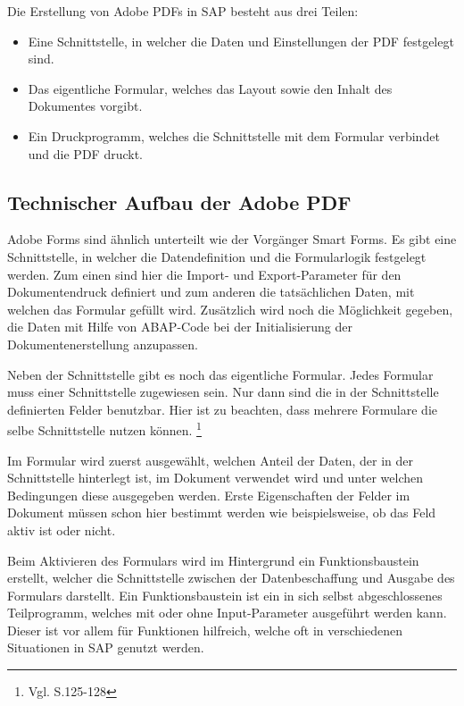    

Die Erstellung von Adobe PDFs in SAP besteht aus drei Teilen:

\begin{itemize}
	\item Eine Schnittstelle, in welcher die Daten und Einstellungen der PDF festgelegt sind.
	\item Das eigentliche Formular, welches das Layout sowie den Inhalt des Dokumentes vorgibt.
	\item Ein Druckprogramm, welches die Schnittstelle mit dem Formular verbindet und die PDF druckt.
\end{itemize}

\subsection{Technischer Aufbau der Adobe \ac{PDF}}

Adobe Forms sind ähnlich unterteilt wie der Vorgänger Smart Forms. Es gibt eine Schnittstelle, in welcher die Datendefinition und die Formularlogik festgelegt werden. Zum einen sind hier die Import- und Export-Parameter für den Dokumentendruck definiert und zum anderen die tatsächlichen Daten, mit welchen das Formular gefüllt wird. Zusätzlich wird noch die Möglichkeit gegeben, die Daten mit Hilfe von \ac{ABAP}-Code bei der Initialisierung der Dokumentenerstellung anzupassen.

Neben der Schnittstelle gibt es noch das eigentliche Formular. Jedes Formular muss einer Schnittstelle zugewiesen sein. Nur dann sind die in der Schnittstelle definierten Felder benutzbar. Hier ist zu beachten, dass mehrere Formulare die selbe Schnittstelle nutzen können. \footnote{Vgl. \cite{Hauser.2015} S.125-128} 

Im Formular wird zuerst ausgewählt, welchen Anteil der Daten, der in der Schnittstelle hinterlegt ist, im Dokument verwendet wird und unter welchen Bedingungen diese ausgegeben werden. Erste Eigenschaften der Felder im Dokument müssen schon hier bestimmt werden wie beispielsweise, ob das Feld aktiv ist oder nicht.

Beim Aktivieren des Formulars wird im Hintergrund ein Funktionsbaustein erstellt, welcher die Schnittstelle zwischen der Datenbeschaffung und Ausgabe des Formulars darstellt. Ein Funktionsbaustein ist ein in sich selbst abgeschlossenes Teilprogramm, welches mit oder ohne Input-Parameter ausgeführt werden kann. Dieser ist vor allem für Funktionen hilfreich, welche oft in verschiedenen Situationen in SAP genutzt werden.


